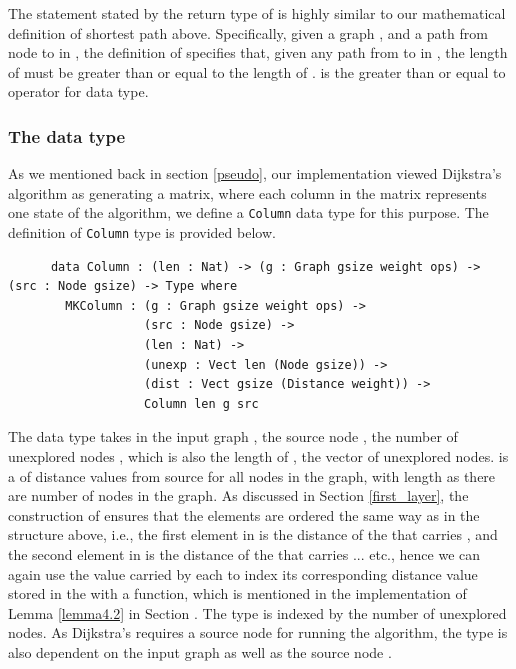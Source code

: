 The statement stated by the return type of  is highly similar to our mathematical definition of shortest path above. Specifically, given a graph , and a path  from node  to  in , the definition of  specifies that, given any path  from  to  in , the length of  must be greater than or equal to the length of .  is the greater than or equal to operator for  data type. 
\\

\subsubsection{The  data type} \label{column}
As we mentioned back in section \ref{pseudo}, our implementation viewed Dijkstra's algorithm as generating a matrix, where each column in the matrix represents one state of the algorithm, we define a \texttt{Column} data type for this purpose. The definition of \texttt{Column} type is provided below. 

\begin{lstlisting}
      data Column : (len : Nat) -> (g : Graph gsize weight ops) -> (src : Node gsize) -> Type where
        MKColumn : (g : Graph gsize weight ops) ->
                   (src : Node gsize) ->
                   (len : Nat) ->
                   (unexp : Vect len (Node gsize)) ->
                   (dist : Vect gsize (Distance weight)) ->
                   Column len g src

\end{lstlisting}

The  data type takes in the input graph , the source node , the number of unexplored nodes , which is also the length of , the vector of unexplored nodes.  is a  of distance values from source for all nodes in the graph, with length  as there are  number of nodes in the graph. As discussed in Section \ref{first_layer}, the construction of  ensures that the elements are ordered the same way as  in the  structure above, i.e., the first element in  is the distance of the  that carries , and the second element in  is the distance of the  that carries  ... etc., hence we can again use the value carried by each  to index its corresponding distance value stored in the  with a  function, which is mentioned in the implementation of Lemma \ref{lemma4.2} in Section . The  type is indexed by the number of unexplored nodes. As Dijkstra's requires a source node for running the algorithm, the type  is also dependent on the input graph as well as the source node .
\\


